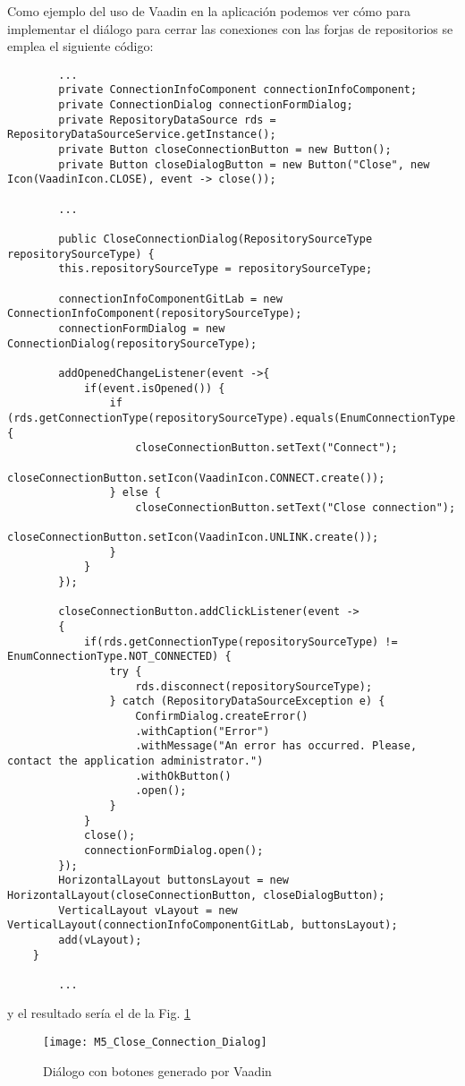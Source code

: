 Como ejemplo del uso de Vaadin en la aplicación podemos ver cómo para implementar el diálogo para cerrar las conexiones con las forjas de repositorios se emplea el siguiente código:

{\tiny
\begin{verbatim}
		...
		private ConnectionInfoComponent connectionInfoComponent;
		private ConnectionDialog connectionFormDialog;
		private RepositoryDataSource rds = RepositoryDataSourceService.getInstance();
		private Button closeConnectionButton = new Button();
		private Button closeDialogButton = new Button("Close", new Icon(VaadinIcon.CLOSE), event -> close());
		
		...
		
		public CloseConnectionDialog(RepositorySourceType repositorySourceType) {
		this.repositorySourceType = repositorySourceType;
		
		connectionInfoComponentGitLab = new ConnectionInfoComponent(repositorySourceType);
		connectionFormDialog = new ConnectionDialog(repositorySourceType);
		
		addOpenedChangeListener(event ->{
			if(event.isOpened()) {
				if (rds.getConnectionType(repositorySourceType).equals(EnumConnectionType.NOT_CONNECTED)) {
					closeConnectionButton.setText("Connect");
					closeConnectionButton.setIcon(VaadinIcon.CONNECT.create());
				} else {
					closeConnectionButton.setText("Close connection");
					closeConnectionButton.setIcon(VaadinIcon.UNLINK.create());
				}							
			}
		});
		
		closeConnectionButton.addClickListener(event ->  
		{
			if(rds.getConnectionType(repositorySourceType) != EnumConnectionType.NOT_CONNECTED) {
				try {
					rds.disconnect(repositorySourceType);
				} catch (RepositoryDataSourceException e) {
					ConfirmDialog.createError()
					.withCaption("Error")
					.withMessage("An error has occurred. Please, contact the application administrator.")
					.withOkButton()
					.open();
				}
			}
			close();
			connectionFormDialog.open();
		});
		HorizontalLayout buttonsLayout = new HorizontalLayout(closeConnectionButton, closeDialogButton);
		VerticalLayout vLayout = new VerticalLayout(connectionInfoComponentGitLab, buttonsLayout);
		add(vLayout);
	}

		...
\end{verbatim}
}

y el resultado sería el de la Fig. \ref{fig:M5_Close_Connection_Dialog}
\begin{figure}[!h]
	\centering
	\texttt{[image: M5\_Close\_Connection\_Dialog]}
	\caption{Diálogo con botones generado por Vaadin}\label{fig:M5_Close_Connection_Dialog}
\end{figure}
\FloatBarrier

